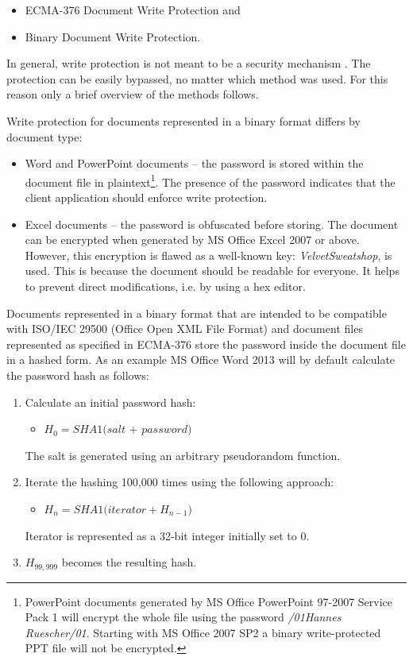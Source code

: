 \documentclass[11pt,oneside]{fithesis2}
\begin{document}
\begin{itemize}
\setlength\itemsep{0.1em}
	\item{ECMA-376 Document Write Protection and}
	\item{Binary Document Write Protection.}
\end{itemize}

In general, write protection is not meant to be a security mechanism \cite[p. 94]{msoffcrypto}. The protection can be easily bypassed, no matter which method was used. For this reason only a brief overview of the methods follows.

Write protection for documents represented in a binary format differs by document type:

\begin{itemize}
\setlength\itemsep{0.1em}
	\item{Word and PowerPoint documents -- the password is stored within the document file in plaintext\footnote{PowerPoint documents generated by MS Office PowerPoint 97-2007 Service Pack 1 will encrypt the whole file using the password \textit{/01Hannes Ruescher/01}. Starting with MS Office 2007 SP2 a binary write-protected PPT file will not be encrypted.}. The presence of the password indicates that the client application should enforce write protection.}
	\item{Excel documents -- the password is obfuscated before storing. The document can be encrypted when generated by MS Office Excel 2007 or above. However, this encryption is flawed as a well-known key: \textit{VelvetSweatshop}, is used. This is because the document should be readable for everyone. It helps to prevent direct modifications, i.e. by using a hex editor.}
\end{itemize}

Documents represented in a binary format that are intended to be compatible with ISO/IEC 29500 (Office Open XML File Format) and document files represented as specified in ECMA-376 store the password inside the document file in a hashed form. As an example MS Office Word 2013 will by default calculate the password hash as follows:

\begin{enumerate}
\item{Calculate an initial password hash:}
	\begin{itemize}
		\item{$H_0 =\textit{SHA1(salt + password)}$}
	\end{itemize}
	The salt is generated using an arbitrary pseudorandom function.
\item{Iterate the hashing 100,000 times using the following approach:}
	\begin{itemize}
		\item{$H_n = \textit{SHA1(iterator}+ H_{n-1})$}
	\end{itemize}
	Iterator is represented as a 32-bit integer initially set to 0.
\item{$H_{99,999}$ becomes the resulting hash.}
\end{enumerate}
\end{document}
